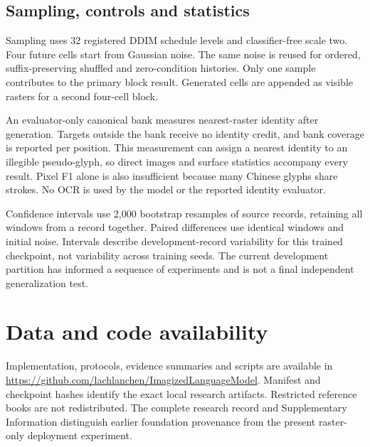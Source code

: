 \subsection*{Sampling, controls and statistics}
Sampling uses 32 registered DDIM schedule levels and classifier-free scale
two. Four future cells start from Gaussian noise. The same noise is reused for
ordered, suffix-preserving shuffled and zero-condition histories. Only one
sample contributes to the primary block result. Generated cells are appended
as visible rasters for a second four-cell block.

An evaluator-only canonical bank measures nearest-raster identity after
generation. Targets outside the bank receive no identity credit, and bank
coverage is reported per position. This measurement can assign a nearest
identity to an illegible pseudo-glyph, so direct images and surface statistics
accompany every result. Pixel F1 alone is also insufficient because many
Chinese glyphs share strokes. No OCR is used by the model or the reported
identity evaluator.

Confidence intervals use 2,000 bootstrap resamples of source records, retaining
all windows from a record together. Paired differences use identical windows
and initial noise. Intervals describe development-record variability for this
trained checkpoint, not variability across training seeds. The current
development partition has informed a sequence of experiments and is not a
final independent generalization test.

\balance
\section*{Data and code availability}
Implementation, protocols, evidence summaries and scripts are available in
\url{https://github.com/lachlanchen/ImagizedLanguageModel}. Manifest and
checkpoint hashes identify the exact local research artifacts. Restricted
reference books are not redistributed. The complete research record and
Supplementary Information distinguish earlier foundation provenance from the
present raster-only deployment experiment.


